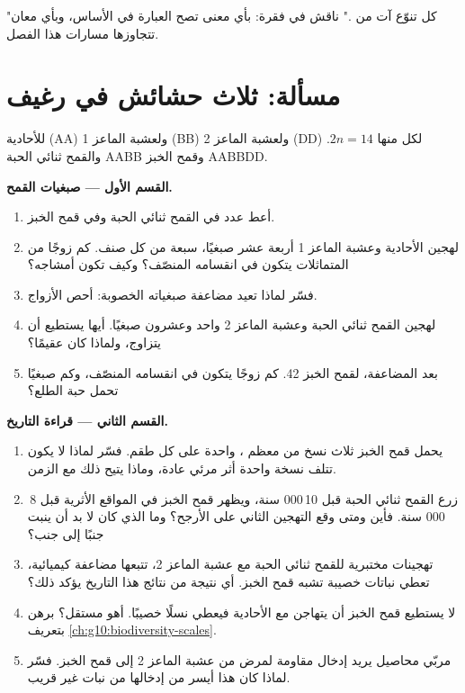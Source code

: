 \begin{exercise}[$\star\star\star$]\label{exo:g12:diversification-of-life:15}
"كل تنوّع آت من ." ناقش في فقرة: بأي معنى تصح العبارة في الأساس،
وبأي معان تتجاوزها مسارات هذا الفصل.
\end{exercise}

\section{مسألة: ثلاث حشائش في رغيف}

\begin{problem}
\label{pb:g12:diversification-of-life:1}
للأحادية (AA) ولعشبة الماعز 1 (BB) ولعشبة الماعز 2 (DD) لكل منها
$2n = 14$. والقمح ثنائي الحبة AABB وقمح الخبز AABBDD.

\medskip
\noindent\textbf{القسم الأول --- صبغيات القمح.}
\begin{enumerate}
  \item أعط عدد  في القمح ثنائي الحبة وفي قمح الخبز.
  \item لهجين الأحادية وعشبة الماعز 1 أربعة عشر صبغيًا، سبعة من كل
        صنف. كم زوجًا من المتماثلات يتكون في انقسامه المنصّف؟ وكيف
        تكون أمشاجه؟
  \item فسّر لماذا تعيد مضاعفة صبغياته الخصوبة: أحص الأزواج.
  \item لهجين القمح ثنائي الحبة وعشبة الماعز 2 واحد وعشرون صبغيًا.
        أيها يستطيع أن يتزاوج، ولماذا كان عقيمًا؟
  \item بعد المضاعفة، لقمح الخبز 42. كم زوجًا يتكون في انقسامه
        المنصّف، وكم صبغيًا تحمل حبة الطلع؟
\end{enumerate}

\medskip
\noindent\textbf{القسم الثاني --- قراءة التاريخ.}
\begin{enumerate}[resume]
  \item يحمل قمح الخبز ثلاث نسخ من معظم ، واحدة على كل طقم.
        فسّر لماذا لا يكون  تتلف نسخة واحدة أثر مرئي عادة، وماذا
        يتيح ذلك مع الزمن.
  \item زرع القمح ثنائي الحبة قبل 10\,000 سنة، ويظهر قمح الخبز في
        المواقع الأثرية قبل 8\,000 سنة. فأين ومتى وقع التهجين الثاني
        على الأرجح؟ وما الذي كان لا بد أن ينبت جنبًا إلى جنب؟
  \item تهجينات مختبرية للقمح ثنائي الحبة مع عشبة الماعز 2، تتبعها
        مضاعفة كيميائية، تعطي نباتات خصيبة تشبه قمح الخبز. أي نتيجة من
        نتائج هذا التاريخ يؤكد ذلك؟
  \item لا يستطيع قمح الخبز أن يتهاجن مع الأحادية فيعطي نسلًا خصيبًا.
        أهو  مستقل؟ برهن بتعريف \cref{ch:g10:biodiversity-scales}.
  \item مربّي محاصيل يريد إدخال  مقاومة لمرض من عشبة الماعز 2
        إلى قمح الخبز. فسّر لماذا كان هذا أيسر من إدخالها من نبات غير
        قريب.
\end{enumerate}


\end{problem}
